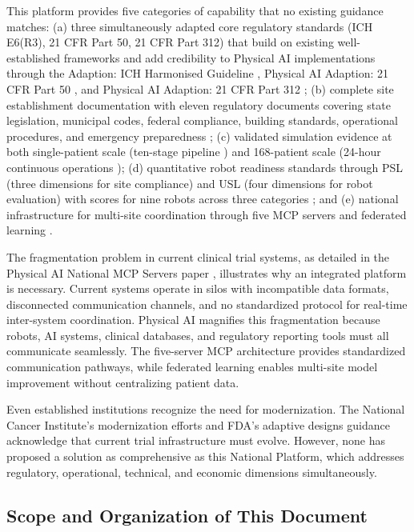 This platform provides five categories of capability that no existing guidance
matches: (a) three simultaneously adapted core regulatory standards (ICH
E6(R3), 21 CFR Part 50, 21 CFR Part 312) that build on existing
well-established frameworks and add credibility to Physical AI implementations
through the Adaption: ICH Harmonised Guideline \cite{ich-adapt}, Physical AI
Adaption: 21 CFR Part 50 \cite{cfr50-adapt}, and Physical AI Adaption: 21 CFR
Part 312 \cite{cfr312-adapt}; (b) complete site establishment documentation
with eleven regulatory documents covering state legislation, municipal codes,
federal compliance, building standards, operational procedures, and emergency
preparedness \cite{site-docs}; (c) validated simulation evidence at both
single-patient scale (ten-stage pipeline \cite{patient-journey-paper}) and
168-patient scale (24-hour continuous operations \cite{site-docs});
(d) quantitative robot readiness standards through PSL (three dimensions for
site compliance) and USL (four dimensions for robot evaluation) with scores
for nine robots across three categories \cite{usl-standard}; and (e) national
infrastructure for multi-site coordination through five MCP servers
\cite{national-mcp-paper} and federated learning \cite{fl-paper}.

The fragmentation problem in current clinical trial systems, as detailed in the
Physical AI National MCP Servers paper \cite{national-mcp-paper}, illustrates
why an integrated platform is necessary. Current systems operate in silos with
incompatible data formats, disconnected communication channels, and no
standardized protocol for real-time inter-system coordination. Physical AI
magnifies this fragmentation because robots, AI systems, clinical databases,
and regulatory reporting tools must all communicate seamlessly. The five-server
MCP architecture provides standardized communication pathways, while federated
learning enables multi-site model improvement without centralizing patient data.

Even established institutions recognize the need for modernization. The
National Cancer Institute's modernization efforts \cite{nci-modernizing} and
FDA's adaptive designs guidance \cite{fda-adaptive-designs} acknowledge that
current trial infrastructure must evolve. However, none has proposed a
solution as comprehensive as this National Platform, which addresses
regulatory, operational, technical, and economic dimensions simultaneously.

\subsection{Scope and Organization of This Document}
\label{subsec:scope}

